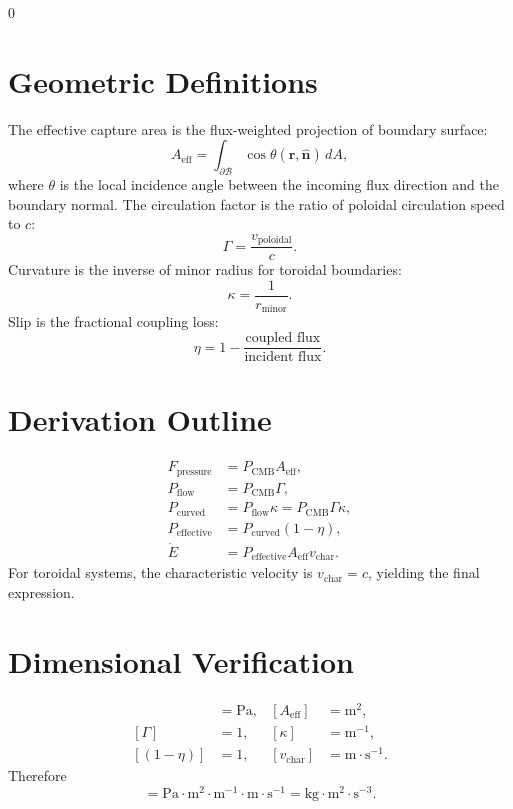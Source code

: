 0\documentclass[12pt]{book}
\begin{document}
\section{Geometric Definitions}
The effective capture area is the flux-weighted projection of boundary surface:
\begin{equation}
A_{\text{eff}} = \int_{\partial \mathcal{B}} \cos\theta(\mathbf{r},\hat{\mathbf{n}})\, dA,
\end{equation}
where $\theta$ is the local incidence angle between the incoming flux direction and the boundary normal.
The circulation factor is the ratio of poloidal circulation speed to $c$:
\begin{equation}
\Gamma = \frac{v_{\text{poloidal}}}{c}.
\end{equation}
Curvature is the inverse of minor radius for toroidal boundaries:
\begin{equation}
\kappa = \frac{1}{r_{\text{minor}}}.
\end{equation}
Slip is the fractional coupling loss:
\begin{equation}
\eta = 1 - \frac{\text{coupled flux}}{\text{incident flux}}.
\end{equation}

\section{Derivation Outline}
\begin{align}
F_{\text{pressure}} &= P_{\text{CMB}} A_{\text{eff}}, \\
P_{\text{flow}} &= P_{\text{CMB}} \Gamma, \\
P_{\text{curved}} &= P_{\text{flow}} \kappa = P_{\text{CMB}} \Gamma \kappa, \\
P_{\text{effective}} &= P_{\text{curved}}(1-\eta), \\
\dot{E} &= P_{\text{effective}} A_{\text{eff}} v_{\text{char}}.
\end{align}
For toroidal systems, the characteristic velocity is $v_{\text{char}} = c$, yielding the final expression.

\section{Dimensional Verification}
\begin{align}
[P_{\text{CMB}}] &= \text{Pa}, &
[A_{\text{eff}}] &= \text{m}^2, \\
[\Gamma] &= 1, &
[\kappa] &= \text{m}^{-1}, \\
[(1-\eta)] &= 1, &
[v_{\text{char}}] &= \text{m}\cdot\text{s}^{-1}.
\end{align}
Therefore
\begin{equation}
[\dot{E}] = \text{Pa}\cdot\text{m}^2\cdot\text{m}^{-1}\cdot\text{m}\cdot\text{s}^{-1}
          = \text{kg}\cdot\text{m}^2\cdot\text{s}^{-3}.
\end{equation}
\end{document}
